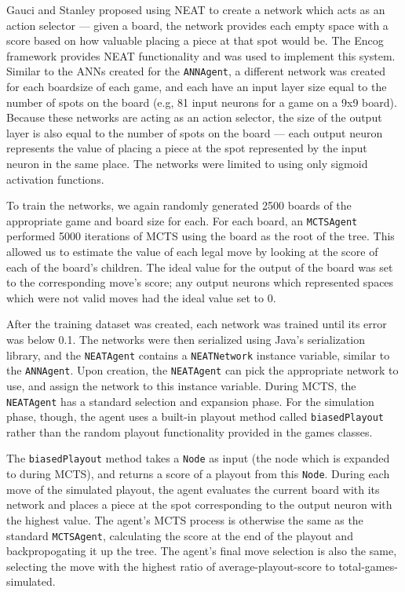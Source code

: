 Gauci and Stanley proposed using NEAT to create a network which acts as an action selector --- given a board, the network provides each empty space with a score based on how valuable placing a piece at that spot would be.  The Encog framework \cite{encog} provides NEAT functionality and was used to implement this system.  Similar to the ANNs created for the \texttt{ANNAgent}, a different network was created for each boardsize of each game, and each have an input layer size equal to the number of spots on the board (e.g, 81 input neurons for a game on a 9x9 board).  Because these networks are acting as an action selector, the size of the output layer is also equal to the number of spots on the board --- each output neuron represents the value of placing a piece at the spot represented by the input neuron in the same place.  The networks were limited to using only sigmoid activation functions.

To train the networks, we again randomly generated 2500 boards of the appropriate game and board size for each.  For each board, an \texttt{MCTSAgent} performed 5000 iterations of MCTS using the board as the root of the tree.  This allowed us to estimate the value of each legal move by looking at the score of each of the board's children.  The ideal value for the output of the board was set to the corresponding move's score; any output neurons which represented spaces which were not valid moves had the ideal value set to 0.  

After the training dataset was created, each network was trained until its error was below 0.1.  The networks were then serialized using Java's serialization library, and the \texttt{NEATAgent} contains a \texttt{NEATNetwork} instance variable, similar to the \texttt{ANNAgent}.  Upon creation, the \texttt{NEATAgent} can pick the appropriate network to use, and assign the network to this instance variable.  During MCTS, the \texttt{NEATAgent} has a standard selection and expansion phase.  For the simulation phase, though, the agent uses a built-in playout method called \texttt{biasedPlayout} rather than the random playout functionality provided in the games classes.

The \texttt{biasedPlayout} method takes a \texttt{Node} as input (the node which is expanded to during MCTS), and returns a score of a playout from this \texttt{Node}.  During each move of the simulated playout, the agent evaluates the current board with its network and places a piece at the spot corresponding to the output neuron with the highest value.  The agent's MCTS process is otherwise the same as the standard \texttt{MCTSAgent}, calculating the score at the end of the playout and backpropogating it up the tree.  The agent's final move selection is also the same, selecting the move with the highest ratio of average-playout-score to total-games-simulated.

